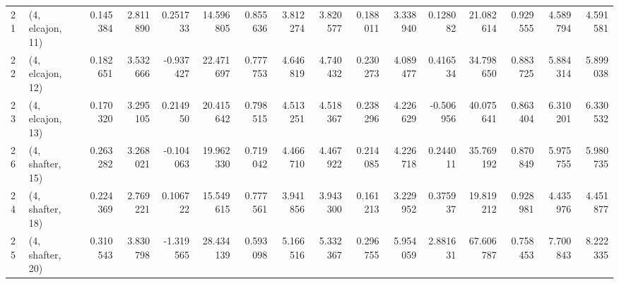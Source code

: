 \begin{tabular}{llrrrrrrrrrrrrrr}
21 &  (4, elcajon, 11) &   0.145384 &  2.811890 &  0.251733 &  14.596805 &  0.855636 &   3.812274 &  3.820577 &  0.188011 &  3.338940 &  0.128082 &   21.082614 &  0.929555 &   4.589794 &   4.591581 \\
22 &  (4, elcajon, 12) &   0.182651 &  3.532666 & -0.937427 &  22.471697 &  0.777753 &   4.646819 &  4.740432 &  0.230273 &  4.089477 &  0.416534 &   34.798650 &  0.883725 &   5.884314 &   5.899038 \\
23 &  (4, elcajon, 13) &   0.170320 &  3.295105 &  0.214950 &  20.415642 &  0.798515 &   4.513251 &  4.518367 &  0.238296 &  4.226629 & -0.506956 &   40.075641 &  0.863404 &   6.310201 &   6.330532 \\
26 &  (4, shafter, 15) &   0.263282 &  3.268021 & -0.104063 &  19.962330 &  0.719042 &   4.466710 &  4.467922 &  0.214085 &  4.226718 &  0.244011 &   35.769192 &  0.870849 &   5.975755 &   5.980735 \\
24 &  (4, shafter, 18) &   0.224369 &  2.769221 &  0.106722 &  15.549615 &  0.777561 &   3.941856 &  3.943300 &  0.161213 &  3.229952 &  0.375937 &   19.819212 &  0.928981 &   4.435976 &   4.451877 \\
25 &  (4, shafter, 20) &   0.310543 &  3.830798 & -1.319565 &  28.434139 &  0.593098 &   5.166516 &  5.332367 &  0.296755 &  5.954059 &  2.881631 &   67.606787 &  0.758453 &   7.700843 &   8.222335 \\
\bottomrule
\end{tabular}
